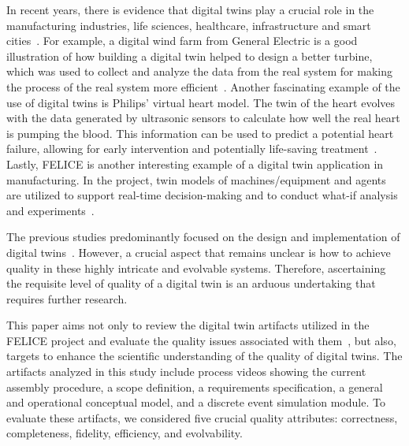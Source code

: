 \documentclass{llncs}
\begin{document}
    In recent years, there is evidence that digital twins play a crucial role in the manufacturing industries, life sciences, healthcare, infrastructure and smart cities~\cite{Review2}.
    For example, a digital wind farm from General Electric is a good illustration of how building a digital twin helped to design a better turbine, 
    which was used to collect and analyze the data from the real system for making the process of the real system more efficient~\cite{GeneralElectricWindTurbine}. 
    Another fascinating example of the use of digital twins is Philips' virtual heart model. The twin of the heart evolves with the data generated by ultrasonic sensors to calculate 
    how well the real heart is pumping the blood. This information can be used to predict a potential heart failure, allowing for early intervention and potentially life-saving treatment~\cite{PhilipsHearth}. 
    Lastly, FELICE is another interesting example of a digital twin application in manufacturing. In the project, twin models of machines/equipment and 
    agents are utilized to support real-time decision-making and to conduct what-if analysis and experiments~\cite{FELICE}.

    The previous studies predominantly focused on the design and implementation of digital twins~\cite{Review1,Review2}. 
    However, a crucial aspect that remains unclear is how to achieve quality in these highly intricate and evolvable systems. 
    Therefore, ascertaining the requisite level of quality of a digital twin is an arduous undertaking that requires further research.

    This paper aims not only to review the digital twin artifacts utilized in the FELICE project and evaluate the quality issues associated with them~\cite{FELICE},  
    but also, targets to enhance the scientific understanding of the quality of digital twins. The artifacts analyzed in this study include process videos showing the current assembly procedure, 
    a scope definition, a requirements specification, a general and operational conceptual model, and a discrete event simulation module. 
    To evaluate these artifacts, we considered five crucial quality attributes: correctness, completeness, fidelity, efficiency, and evolvability.
    
\end{document}
